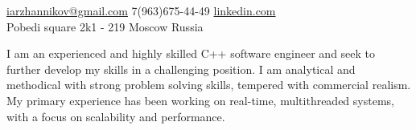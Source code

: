 \documentclass[10pt,a4paper]{article}
\begin{document}
\sloppy  %



\nobreakvspace{0.3em}  %

\noindent\href{mailto:iarzhannikov@gmail.com}{iarzhannikov\mbox{}@\mbox{}gmail.com}\sbull
\textsmaller{+}7(963)675-44-49\sbull
\href{https://www.linkedin.com/in/%D0%B0%D1%80%D0%B6%D0%B0%D0%BD%D0%BD%D0%B8%D0%BA%D0%BE%D0%B2-%D0%B8%D0%BB%D1%8C%D1%8F-8a125b37/en}{linkedin.com}
\\
Pobedi square 2k1 - 219\sbull
Moscow\sbull
Russia

\spacedhrule{0.9em}{-0.4em}  %


\vspace{-1.3em}  %
\begin{multicols}{2}  %
\noindent
I am an experienced and highly skilled C++ software engineer and seek to further develop my skills in a challenging position. I am analytical and methodical with strong problem solving skills, tempered with commercial realism. My primary experience has been working on real-time, multithreaded systems, with a focus on scalability and performance.
\end{multicols}


\spacedhrule{0em}{-0.4em}

\end{document}
